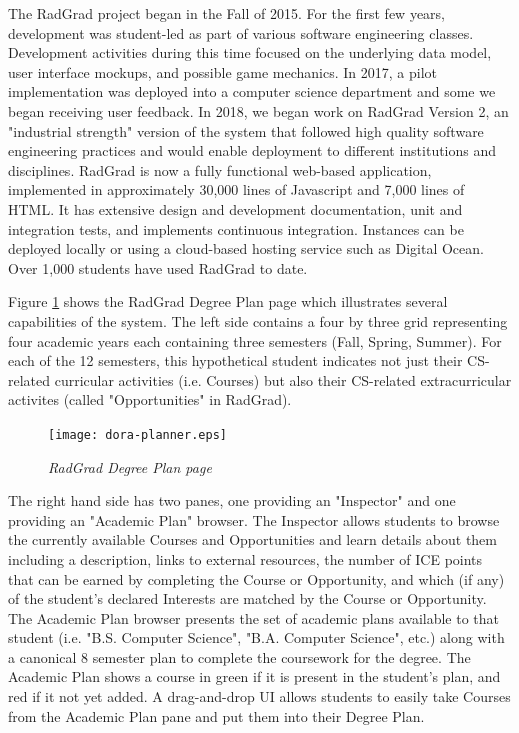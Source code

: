 \documentclass[acmsmall]{acmart}
\begin{document}
The RadGrad project began in the Fall of 2015. For the first few years, development was student-led as part of various software engineering classes. Development activities during this time focused on the underlying data model, user interface mockups, and possible game mechanics. In 2017, a pilot implementation was deployed into a computer science department and some we began receiving user feedback. In 2018, we began work on RadGrad Version 2, an "industrial strength" version of the system that followed high quality software engineering practices and would enable deployment to different institutions and disciplines. RadGrad is now a fully functional web-based application, implemented in approximately 30,000 lines of Javascript and 7,000 lines of HTML. It has extensive design and development documentation, unit and integration tests, and implements continuous integration. Instances can be deployed locally or using a cloud-based hosting service such as Digital Ocean. Over 1,000 students have used RadGrad to date.

Figure \ref{fig:radgrad} shows the RadGrad Degree Plan page which illustrates several capabilities of the system. The left side contains a four by three grid representing four academic years each containing three semesters (Fall, Spring, Summer).  For each of the 12 semesters, this hypothetical student indicates not just their CS-related curricular activities (i.e. Courses) but also their CS-related extracurricular activites (called "Opportunities" in RadGrad).

\begin{figure}[ht]
\centering
\texttt{[image: dora-planner.eps]}
\caption{\em RadGrad Degree Plan page}
\label{fig:radgrad}
\end{figure}

The right hand side has two panes, one providing an "Inspector" and one providing an "Academic Plan" browser. The Inspector allows students to browse the currently available Courses and Opportunities and learn details about them including a description, links to external resources, the number of ICE points that can be earned by completing the Course or Opportunity, and which (if any) of the student's declared Interests are matched by the Course or Opportunity. The Academic Plan browser presents the set of academic plans available to that student (i.e. "B.S. Computer Science", "B.A. Computer Science", etc.) along with a canonical 8 semester plan to complete the coursework for the degree. The Academic Plan shows a course in green if it is present in the student's plan, and red if it not yet added. A drag-and-drop UI allows students to easily take Courses from the Academic Plan pane and put them into their Degree Plan.
\end{document}
